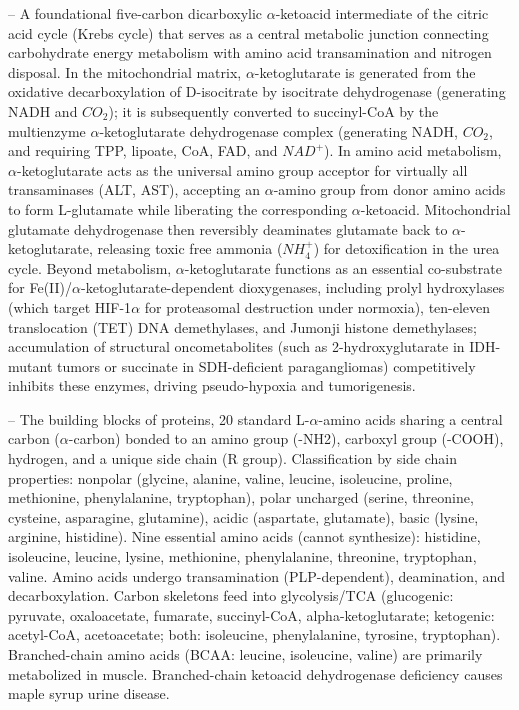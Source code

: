 -- A foundational five-carbon dicarboxylic $\alpha$-ketoacid intermediate of the citric acid cycle (Krebs cycle) that serves as a central metabolic junction connecting carbohydrate energy metabolism with amino acid transamination and nitrogen disposal. In the mitochondrial matrix, $\alpha$-ketoglutarate is generated from the oxidative decarboxylation of D-isocitrate by isocitrate dehydrogenase (generating NADH and $CO_2$); it is subsequently converted to succinyl-CoA by the multienzyme $\alpha$-ketoglutarate dehydrogenase complex (generating NADH, $CO_2$, and requiring TPP, lipoate, CoA, FAD, and $NAD^+$). In amino acid metabolism, $\alpha$-ketoglutarate acts as the universal amino group acceptor for virtually all transaminases (ALT, AST), accepting an $\alpha$-amino group from donor amino acids to form L-glutamate while liberating the corresponding $\alpha$-ketoacid. Mitochondrial glutamate dehydrogenase then reversibly deaminates glutamate back to $\alpha$-ketoglutarate, releasing toxic free ammonia ($NH_4^+$) for detoxification in the urea cycle. Beyond metabolism, $\alpha$-ketoglutarate functions as an essential co-substrate for Fe(II)/$\alpha$-ketoglutarate-dependent dioxygenases, including prolyl hydroxylases (which target HIF-1$\alpha$ for proteasomal destruction under normoxia), ten-eleven translocation (TET) DNA demethylases, and Jumonji histone demethylases; accumulation of structural oncometabolites (such as 2-hydroxyglutarate in IDH-mutant tumors or succinate in SDH-deficient paragangliomas) competitively inhibits these enzymes, driving pseudo-hypoxia and tumorigenesis.

-- The building blocks of proteins, 20 standard L-$\alpha$-amino acids sharing a central carbon ($\alpha$-carbon) bonded to an amino group (-NH2), carboxyl group (-COOH), hydrogen, and a unique side chain (R group). Classification by side chain properties: nonpolar (glycine, alanine, valine, leucine, isoleucine, proline, methionine, phenylalanine, tryptophan), polar uncharged (serine, threonine, cysteine, asparagine, glutamine), acidic (aspartate, glutamate), basic (lysine, arginine, histidine). Nine essential amino acids (cannot synthesize): histidine, isoleucine, leucine, lysine, methionine, phenylalanine, threonine, tryptophan, valine. Amino acids undergo transamination (PLP-dependent), deamination, and decarboxylation. Carbon skeletons feed into glycolysis/TCA (glucogenic: pyruvate, oxaloacetate, fumarate, succinyl-CoA, alpha-ketoglutarate; ketogenic: acetyl-CoA, acetoacetate; both: isoleucine, phenylalanine, tyrosine, tryptophan). Branched-chain amino acids (BCAA: leucine, isoleucine, valine) are primarily metabolized in muscle. Branched-chain ketoacid dehydrogenase deficiency causes maple syrup urine disease.

